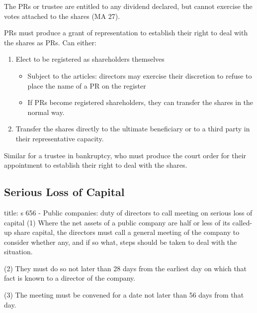 \documentclass[
]{article}
\newenvironment{Shaded}{}{}
\newcommand{\NormalTok}[1]{#1}
\providecommand{\tightlist}{%
  \setlength{\itemsep}{0pt}\setlength{\parskip}{0pt}}
\begin{document}
The PRs or trustee are entitled to any dividend declared, but cannot
exercise the votes attached to the shares (MA 27).

PRs must produce a grant of representation to establish their right to
deal with the shares as PRs. Can either:

\begin{enumerate}
\def\labelenumi{\arabic{enumi}.}
\tightlist
\item
  Elect to be registered as shareholders themselves

  \begin{itemize}
  \tightlist
  \item
    Subject to the articles: directors may exercise their discretion to
    refuse to place the name of a PR on the register
  \item
    If PRs become registered shareholders, they can transfer the shares
    in the normal way.
  \end{itemize}
\item
  Transfer the shares directly to the ultimate beneficiary or to a third
  party in their representative capacity.
\end{enumerate}

Similar for a trustee in bankruptcy, who must produce the court order
for their appointment to establish their right to deal with the shares.

\hypertarget{serious-loss-of-capital}{%
\subsection{Serious Loss of Capital}\label{serious-loss-of-capital}}

\begin{Shaded}
\begin{Highlighting}[]
\NormalTok{title: s 656 {-} Public companies: duty of directors to call meeting on serious loss of capital}
\NormalTok{(1) Where the net assets of a public company are half or less of its called{-}up share capital, the directors must call a general meeting of the company to consider whether any, and if so what, steps should be taken to deal with the situation.}

\NormalTok{(2) They must do so not later than 28 days from the earliest day on which that fact is known to a director of the company.}

\NormalTok{(3) The meeting must be convened for a date not later than 56 days from that day.}
\end{Highlighting}
\end{Shaded}
\end{document}
